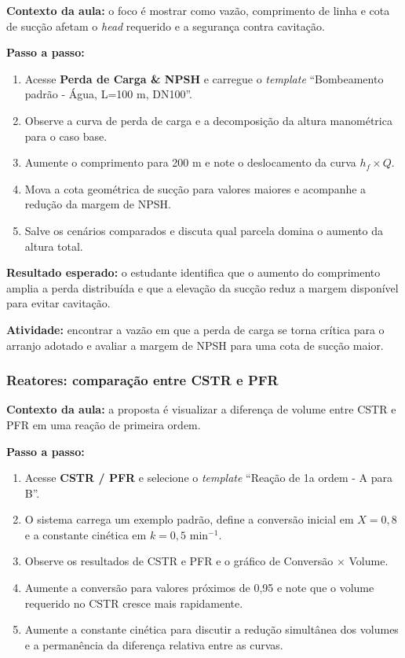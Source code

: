 \textbf{Contexto da aula:} o foco é mostrar como vazão, comprimento de linha e cota de sucção afetam o \textit{head} requerido e a segurança contra cavitação.

\textbf{Passo a passo:}
\begin{enumerate}
    \item Acesse \textbf{Perda de Carga \& NPSH} e carregue o \textit{template} ``Bombeamento padrão - Água, L=100 m, DN100''.
    \item Observe a curva de perda de carga e a decomposição da altura manométrica para o caso base.
    \item Aumente o comprimento para 200 m e note o deslocamento da curva $h_f \times Q$.
    \item Mova a cota geométrica de sucção para valores maiores e acompanhe a redução da margem de NPSH.
    \item Salve os cenários comparados e discuta qual parcela domina o aumento da altura total.
\end{enumerate}

\textbf{Resultado esperado:} o estudante identifica que o aumento do comprimento amplia a perda distribuída e que a elevação da sucção reduz a margem disponível para evitar cavitação.

\textbf{Atividade:} encontrar a vazão em que a perda de carga se torna crítica para o arranjo adotado e avaliar a margem de NPSH para uma cota de sucção maior.

\subsubsection{Reatores: comparação entre CSTR e PFR}

\textbf{Contexto da aula:} a proposta é visualizar a diferença de volume entre CSTR e PFR em uma reação de primeira ordem.

\textbf{Passo a passo:}
\begin{enumerate}
    \item Acesse \textbf{CSTR / PFR} e selecione o \textit{template} ``Reação de 1a ordem - A para B''.
    \item O sistema carrega um exemplo padrão, define a conversão inicial em $X = 0{,}8$ e a constante cinética em $k = 0{,}5$ min$^{-1}$.
    \item Observe os resultados de CSTR e PFR e o gráfico de Conversão $\times$ Volume.
    \item Aumente a conversão para valores próximos de 0,95 e note que o volume requerido no CSTR cresce mais rapidamente.
    \item Aumente a constante cinética para discutir a redução simultânea dos volumes e a permanência da diferença relativa entre as curvas.
\end{enumerate}

